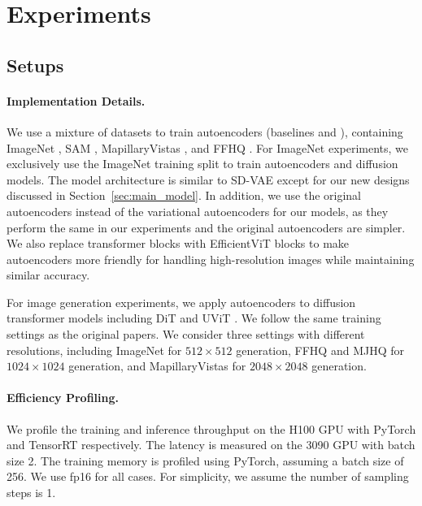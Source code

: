 \section{Experiments}
\label{sec:exp}



\subsection{Setups}

\paragraph{Implementation Details.} We use a mixture of datasets to train autoencoders (baselines and \modelshort), containing ImageNet \citep{deng2009imagenet}, SAM \citep{kirillov2023segment}, MapillaryVistas \citep{neuhold2017mapillary}, and FFHQ \citep{karras2019style}. For ImageNet experiments, we exclusively use the ImageNet training split to train autoencoders and diffusion models. The model architecture is similar to SD-VAE \citep{rombach2022high} except for our new designs discussed in Section~\ref{sec:main_model}. In addition, we use the original autoencoders instead of the variational autoencoders for our models, as they perform the same in our experiments and the original autoencoders are simpler. We also replace transformer blocks with EfficientViT blocks \citep{cai2023efficientvit} to make autoencoders more friendly for handling high-resolution images while maintaining similar accuracy. 

For image generation experiments, we apply autoencoders to diffusion transformer models including DiT \citep{peebles2023scalable} and UViT \citep{bao2023all}. We follow the same training settings as the original papers. 
We consider three settings with different resolutions, including ImageNet \citep{deng2009imagenet} for $512 \times 512$ generation, FFHQ \citep{karras2019style} and MJHQ \citep{li2024playground} for $1024 \times 1024$ generation, and MapillaryVistas \citep{neuhold2017mapillary} for $2048 \times 2048$ generation. 









\paragraph{Efficiency Profiling.} We profile the training and inference throughput on the H100 GPU with PyTorch and TensorRT respectively. The latency is measured on the 3090 GPU with batch size 2. The training memory is profiled using PyTorch, assuming a batch size of 256. We use fp16 for all cases. For simplicity, we assume the number of sampling steps is 1.

